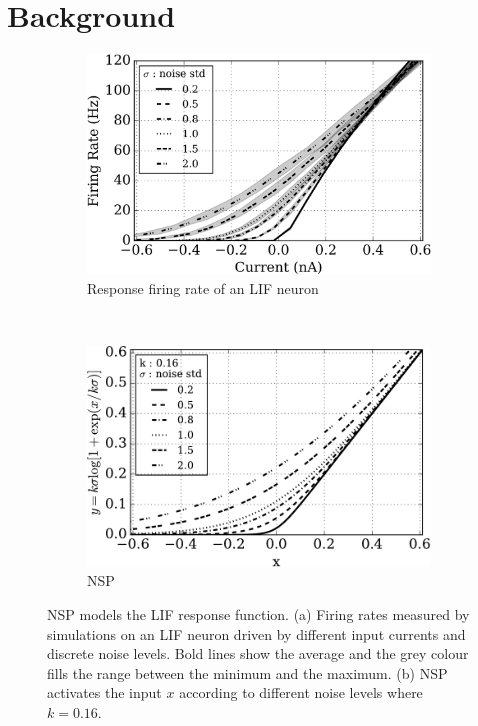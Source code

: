 \documentclass{article}
\begin{document}
	\section{Background}
	\label{sec:back}
	\begin{figure}[thb!]
		\centering
		\begin{subfigure}[t]{0.4\textwidth}
			\includegraphics[width=\textwidth]{pics_iconip/siegert.png}
			\caption{Response firing rate of an LIF neuron}
		\end{subfigure}~~~~~~
		\begin{subfigure}[t]{0.4\textwidth}
			\includegraphics[width=\textwidth]{pics_iconip/4.pdf}
			\caption{NSP}
		\end{subfigure}
		\caption{
			NSP models the LIF response function.
			(a) Firing rates measured by simulations on an LIF neuron driven by different input currents and discrete noise levels.
			Bold lines show the average and the grey colour fills the range between the minimum and the maximum.
			(b) NSP activates the input $x$ according to different noise levels where $k=0.16$.}
		\label{fig:ns}
	\end{figure}
\end{document}
